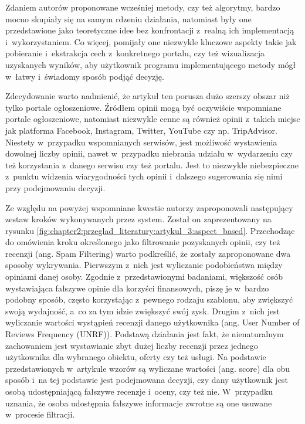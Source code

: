 \documentclass[../Kamil_Kowalewski_Main.tex]{subfiles}
\begin{document}
{{        Zdaniem autorów proponowane wcześniej metody, czy też algorytmy, bardzo mocno
        skupiały się na samym rdzeniu działania, natomiast były one przedstawione jako
        teoretyczne idee bez konfrontacji z~realną ich implementacją i~wykorzystaniem.
        Co więcej, pomijały one niezwykle kluczowe aspekty takie jak pobieranie
        i~ekstrakcja cech z~konkretnego portalu, czy też wizualizacja uzyskanych wyników,
        aby użytkownik programu implementującego metody mógł w~łatwy i~świadomy sposób
        podjąć decyzję.

        Zdecydowanie warto nadmienić, że artykuł ten porusza dużo szerszy obszar niż
        tylko portale ogłoszeniowe. Źródłem opinii mogą być oczywiście wspomniane
        portale ogłoszeniowe, natomiast niezwykle cenne są również opinii z~takich
        miejsc jak platforma Facebook\cite{website:facebook},
        Instagram\cite{website:instagram}, Twitter\cite{website:twitter},
        YouTube\cite{website:youtube} czy np. TripAdvisor\cite{website:tripadvisor}.
        Niestety w~przypadku wspomnianych serwisów, jest możliwość wystawienia dowolnej
        liczby opinii, nawet w~przypadku niebrania udziału w~wydarzeniu czy też
        korzystania z~danego serwisu czy też portalu. Jest to niezwykle niebezpieczne
        z~punktu widzenia wiarygodności tych opinii i~dalszego sugerowania się nimi
        przy podejmowaniu decyzji.

        Ze względu na powyżej wspomniane kwestie autorzy zaproponowali następujący
        zestaw kroków wykonywanych przez system. Został on zaprezentowany na rysunku
        \ref{fig:chapter2:przeglad_literatury:artykul_3:aspect_based}. Przechodząc do
        omówienia kroku określonego jako filtrowanie pozyskanych opinii, czy też
        recenzji (ang. Spam Filtering) warto podkreślić, że zostały zaproponowane dwa
        sposoby wykrywania. Pierwszym z~nich jest wyliczanie podobieństwa między
        opiniami danej osoby. Zgodnie z~przedstawionymi badaniami, większość osób
        wystawiająca fałszywe opinie dla korzyści finansowych, piszę je w~bardzo
        podobny sposób, często korzystając z~pewnego rodzaju szablonu, aby zwiększyć
        swoją wydajność, a~co za tym idzie zwiększyć swój zysk. Drugim z~nich jest
        wyliczanie wartości wystąpień recenzji danego użytkownika (ang. User Number of
        Reviews Frequency (UNRF)). Podstawą działania jest fakt, że nienaturalnym
        zachowaniem jest wystawianie zbyt dużej liczby recenzji przez jednego
        użytkownika dla wybranego obiektu, oferty czy też usługi. Na podstawie
        przedstawionych w~artykule wzorów są wyliczane wartości (ang. score) dla obu
        sposób i~na tej podstawie jest podejmowana decyzji, czy dany użytkownik jest
        osobą udostępniającą fałszywe recenzje i~oceny, czy też nie. W~przypadku
        uznania, że osoba udostępnia fałszywe informacje zwrotne są one usuwane
        w~procesie filtracji.

}}
\end{document}
